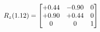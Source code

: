 \documentclass[preview]{standalone}
\begin{document}
\begin{align*}
\special{dvisvgm:raw <g id='unique000'>}R_{z}(1.12) = \begin{bmatrix}+0.44 & -0.90 & 0 \\+0.90 & +0.44 & 0 \\0 & 0 & 1\end{bmatrix}\special{dvisvgm:raw </g>}
\end{align*}
\end{document}
